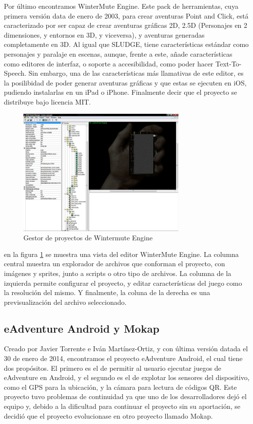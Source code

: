 Por último encontramos WinterMute Engine. Este pack de herramientas, cuya primera versión data de enero de 2003, para crear aventuras Point and Click, está caracterizado por ser capaz de crear aventuras gráficas 2D, 2.5D (Personajes en 2 dimensiones, y entornos en 3D, y viceversa), y aventuras generadas completamente en 3D. Al igual que SLUDGE, tiene características estándar como personajes y paralaje en escenas, aunque, frente a este, añade características como editores de interfaz, o soporte a accesibilidad, como poder hacer Text-To-Speech. Sin embargo, una de las características más llamativas de este editor, es la posilibidad de poder generar aventuras gráficas y que estas se ejecuten en iOS, pudiendo instalarlas en un iPad o iPhone. Finalmente decir que el proyecto se distribuye bajo licencia MIT.

\begin{figure}[htb]
	\centerline{\includegraphics[height=2.5in]{figures/wme.jpg}}
	\caption[WinterMute Engine]{Gestor de proyectos de Wintermute Engine}
	\label{wmengine}
\end{figure}

en la figura \ref{wmengine} se muestra una vista del editor WinterMute Engine. La columna central muestra un explorador de archivos que conforman el proyecto, con imágenes y sprites, junto a scripts o otro tipo de archivos. La columna de la izquierda permite configurar el proyecto, y editar características del juego como la resolución del mismo. Y finalmente, la coluna de la derecha es una previsualización del archivo seleccionado.

\subsection{eAdventure Android y Mokap}
\label{eandroidmokap}

Creado por Javier Torrente e Iván Martínez-Ortiz, y con última versión datada el 30 de enero de 2014, encontramos el proyecto eAdventure Android, el cual tiene dos propósitos. El primero es el de permitir al usuario ejecutar juegos de eAdventure en Android, y el segundo es el de explotar los sensores del dispositivo, como el GPS para la ubicación, y la cámara para lectura de códigos QR. Este proyecto tuvo problemas de continuidad ya que uno de los desarrolladores dejó el equipo y, debido a la dificultad para continuar el proyecto sin su aportación, se decidió que el proyecto evolucionase en otro proyecto llamado Mokap.

